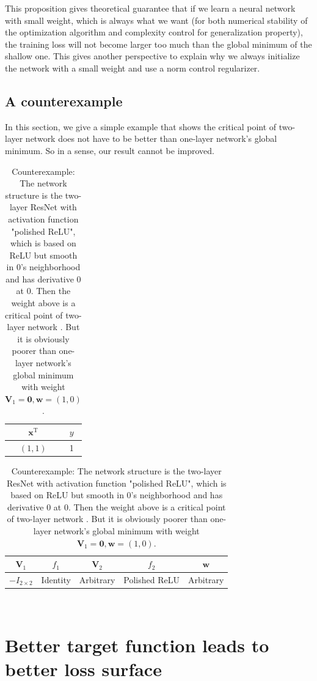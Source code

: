 \documentclass{article}
\theoremstyle{plain}
\theoremstyle{definition}
\begin{document}
This proposition gives theoretical guarantee that if we learn a neural network with small weight, 
which is always what we want (for both numerical stability of the optimization algorithm and complexity control for generalization property), 
the training loss will not become larger too much than the global minimum of the shallow one. 
This gives another perspective to explain why we always initialize the network with a small weight 
and use a norm control regularizer.

\subsection{A counterexample}
In this section, we give a simple example that shows the critical point of two-layer network does not have to be better
than one-layer network's global minimum. So in a sense, our result cannot be improved.

\begin{table}[H]
\begin{minipage}[t]{0.3\linewidth}
\centering
\begin{tabular}{|c|c|}
\hline $\mathbf x^\mathrm{T}$&$y$\\
\hline $(1,1)$&1\\
\hline
\end{tabular}
\end{minipage}
\begin{minipage}[t]{0.5\linewidth}
\centering
\begin{tabular}{|c|c|c|c|c|}
\hline $\mathbf V_1$&$f_1$&$\mathbf V_2$&$f_2$&$\mathbf w$\\
\hline $-I_{2\times 2}$&Identity&Arbitrary&Polished ReLU&Arbitrary\\
\hline
\end{tabular}
\end{minipage}
\\
\caption{Counterexample: The network structure is the two-layer ResNet with activation function "polished ReLU",
which is based on ReLU but smooth in 0's neighborhood and has derivative 0 at 0. Then the weight above is a critical point of two-layer network . But it is obviously poorer than one-layer network's global minimum with weight $\mathbf V_1=\mathbf 0, \mathbf w=(1,0)$.}
\end{table}

\section{Better target function leads to better loss surface}
\end{document}
